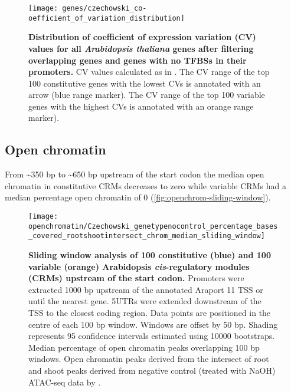 \documentclass[../main.tex]{subfiles}
\begin{document}
\begin{figure}[hbt!]
	\begin{center}
		\capstart
		\texttt{[image: genes/czechowski\_co-oefficient\_of\_variation\_distribution]}
		\caption{
			\textbf{Distribution of coefficient of expression variation (CV) values for all \textit{Arabidopsis thaliana} genes after filtering overlapping genes and genes with no TFBSs in their promoters.}
			CV values calculated as in \textcite{czechowskiGenomeWideIdentificationTesting2005}.
			The CV range of the top 100 constitutive genes with the lowest CVs is annotated with an arrow (blue range marker).
			The CV range of the top 100 variable genes with the highest CVs is annotated with an orange range marker).			
			\label{fig:cv-dist-allgenes}
		}
	\end{center}
\end{figure}

\subsection{Open chromatin}

From \textasciitilde{}350 bp to \textasciitilde{}650 bp upstream of the start codon the median open chromatin in constitutive CRMs decreases to zero while variable CRMs had a median percentage open chromatin of 0 (\autoref{fig:openchrom-sliding-window}).

\begin{figure}[!h]
	\begin{center}
		\capstart
		\texttt{[image: openchromatin/Czechowski\_genetypenocontrol\_percentage\_bases\_covered\_rootshootintersect\_chrom\_median\_sliding\_window]}
		\caption{
			\textbf{Sliding window analysis of 100 constitutive (blue) and 100 variable (orange) Arabidopsis \textit{cis}\hyp{}regulatory modules (CRMs) upstream of the start codon.}
			Promoters were extracted 1000 bp upstream of the annotated Araport 11 \autocite{chengAraport11CompleteReannotation2017} TSS or until the nearest gene.
			5UTRs were extended downstream of the TSS to the closest coding region.
			Data points are positioned in the centre of each 100 bp window.
			Windows are offset by 50 bp.
			Shading represents 95 confidence intervals estimated using 10000 bootstraps.
			Median percentage of open chromatin peaks overlapping 100 bp windows. Open chromatin peaks derived from the intersect of root and shoot peaks derived from negative control (treated with NaOH) ATAC\hyp{}seq data by \textcite{potterCytokininModulatesContextdependent2018}.		
			\label{fig:openchrom-sliding-window}
		}
	\end{center}
\end{figure}
\end{document}
